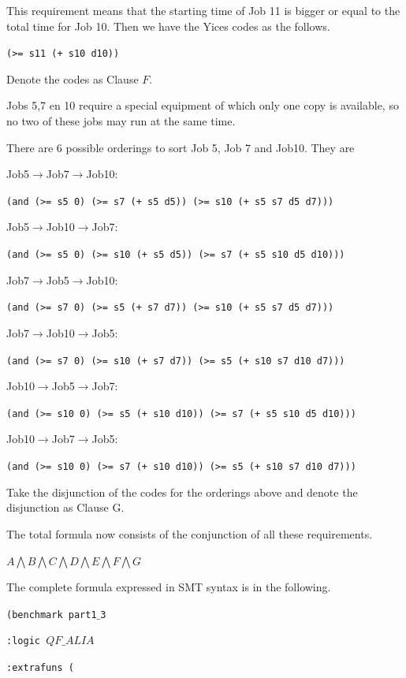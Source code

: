 \documentclass[11pt]{article}
\begin{document}
{{\begin{description}
  This requirement means that the starting time of Job 11 is bigger or equal to the total time for Job 10.
  Then we have the Yices codes as the follows.
  \begin{center}
  {\tt (>= s11 (+ s10 d10))}
  \end{center}
  Denote the codes as Clause $F$.
  \item[Requirement 9:] Jobs 5,7 en 10 require a special equipment of which only one copy is available, so no two of these jobs may run at the same time.

  There are 6 possible orderings to sort Job 5, Job 7 and Job10. They are

  Job5$\rightarrow$Job7$\rightarrow$Job10:

  {\tt (and (>= s5 0) (>= s7 (+ s5 d5)) (>= s10 (+ s5 s7 d5 d7)))}

  Job5$\rightarrow$Job10$\rightarrow$Job7:

  {\tt (and (>= s5 0) (>= s10 (+ s5 d5)) (>= s7 (+ s5 s10 d5 d10)))}

  Job7$\rightarrow$Job5$\rightarrow$Job10:

  {\tt (and (>= s7 0) (>= s5 (+ s7 d7)) (>= s10 (+ s5 s7 d5 d7)))}

  Job7$\rightarrow$Job10$\rightarrow$Job5:

  {\tt (and (>= s7 0) (>= s10 (+ s7 d7)) (>= s5 (+ s10 s7 d10 d7)))}

  Job10$\rightarrow$Job5$\rightarrow$Job7:

  {\tt (and (>= s10 0) (>= s5 (+ s10 d10)) (>= s7 (+ s5 s10 d5 d10)))}

  Job10$\rightarrow$Job7$\rightarrow$Job5:

  {\tt (and (>= s10 0) (>= s7 (+ s10 d10)) (>= s5 (+ s10 s7 d10 d7)))}

  Take the disjunction of the codes for the orderings above and denote the disjunction as Clause G.
\end{description}
The total formula now consists of the conjunction of all these requirements.
\begin{center}
$A \bigwedge B \bigwedge C \bigwedge D \bigwedge E \bigwedge F \bigwedge G$
\end{center}
The complete formula expressed in SMT syntax is in the following.

{\footnotesize

{\tt (benchmark part1$\_$3}

{\tt :logic $QF\_ALIA$}

{\tt :extrafuns (}

}}}
\end{document}
